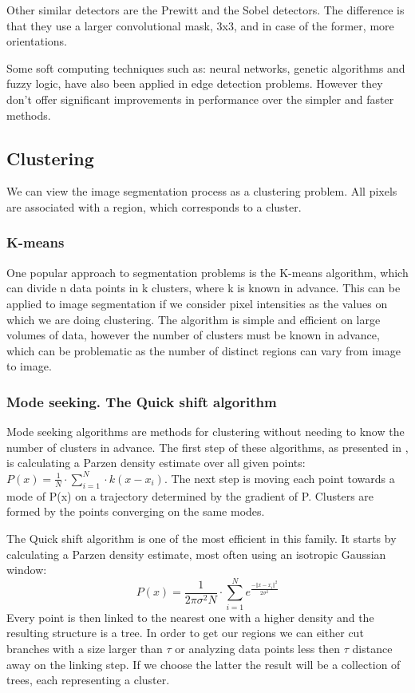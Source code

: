 \documentclass[12pt]{report}
\begin{document}
	Other similar detectors are the Prewitt and the Sobel detectors\cite{edge_detection_survey}. The difference is that they use a larger convolutional mask, 3x3, and in case of the former, more orientations.
	
	Some soft computing techniques such as: neural networks, genetic algorithms and fuzzy logic\cite{edge_detection_survey}, have also been applied in edge detection problems. However they don't offer significant improvements in performance over the simpler and faster methods.
	
	\subsection{Clustering}
	We can view the image segmentation process as a clustering problem. All pixels are associated with a region, which corresponds to a cluster.
	
	\subsubsection{K-means}
	One popular approach to segmentation problems is the K-means algorithm, which can divide n data points in k clusters, where k is known in advance. This can be applied to image segmentation if we consider pixel intensities as the values on which we are doing clustering. The algorithm is simple and efficient on large volumes of data\cite{image_segmentation_techniques}, however the number of clusters must be known in advance, which can be problematic as the number of distinct regions can vary from image to image.
	
	\subsubsection{Mode seeking. The Quick shift algorithm}
	Mode seeking algorithms are methods for clustering without needing to know the number of clusters in advance. The first step of these algorithms, as presented in \cite{mode_seeking}, is calculating a Parzen density estimate over all given points: \(P(x)=\frac{1}{N} \cdot \sum_{i=1}^{N} \cdot k(x-x_i)\). The next step is moving each point towards a mode of P(x) on a trajectory determined by the gradient of P. Clusters are formed by the points converging on the same modes.
	
	The Quick shift algorithm\cite{quickshift_gpu} is one of the most efficient in this family. It starts by calculating a Parzen density estimate, most often using an isotropic Gaussian window:
	\begin{equation}
	P(x) = \frac{1}{2 \pi \sigma^2 N} \cdot \sum_{i=1}^{N} e^\frac{-\Vert x - x_i \Vert^2}{2 \sigma^2}
	\end{equation}
	Every point is then linked to the nearest one with a higher density and the resulting structure is a tree. In order to get our regions we can either cut branches with a size larger than \(\tau\) or analyzing data points less then \(\tau\) distance away on the linking step. If we choose the latter the result will be a collection of trees, each representing a cluster.
	
\end{document}

